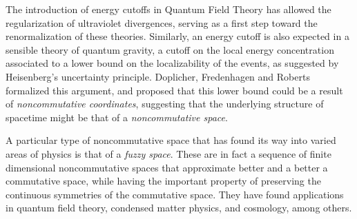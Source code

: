 The introduction of energy cutoffs in Quantum Field Theory has allowed the regularization of ultraviolet divergences, serving as a first step toward the renormalization of these theories. Similarly, an energy cutoff is also expected in a sensible theory of quantum gravity, a cutoff on the local energy concentration associated to a lower bound on the localizability of the events, as suggested by Heisenberg's uncertainty principle. Doplicher, Fredenhagen and Roberts \cite{DFR} formalized this argument, and proposed that this lower bound could be a result of \textit{noncommutative coordinates}, suggesting that the underlying structure of spacetime might be that of a \emph{noncommutative space}.

A particular type of noncommutative space that has found its way into varied areas of physics is that of a \emph{fuzzy space}. These are in fact a sequence of finite dimensional noncommutative spaces that approximate better and a better a commutative space, while having the important property of preserving the continuous symmetries of the commutative space. They have found applications in quantum field theory, condensed matter physics, and  cosmology, among others.


